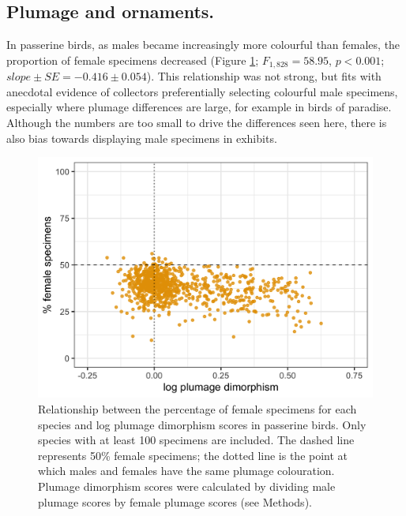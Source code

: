 \documentclass[a4paper, 12pt]{article}
\begin{document}
\subsection{Plumage and ornaments.} 
In passerine birds, as males became increasingly more colourful than females, the proportion of female specimens decreased (Figure \ref{fig-plumage}; $F_{1, 828} = 58.95$, $p < 0.001$; $slope \pm SE = -0.416 \pm 0.054$). 
This relationship was not strong, but fits with anecdotal evidence of collectors preferentially selecting colourful male specimens, especially where plumage differences are large, for example in birds of paradise. 
Although the numbers are too small to drive the differences seen here, there is also bias towards displaying male specimens in exhibits\cite{machin2008}.

\begin{figure}
 \centering
  \includegraphics[width = \linewidth]{figures/plumage.png}
  \caption{Relationship between the percentage of female specimens for each species and log plumage dimorphism scores in passerine birds. 
  Only species with at least 100 specimens are included. 
  The dashed line represents 50\% female specimens; the dotted line is the point at which males and females have the same plumage colouration. 
  Plumage dimorphism scores were calculated by dividing male plumage scores by female plumage scores (see Methods). 
}
  \label{fig-plumage}
\end{figure}
\end{document}
